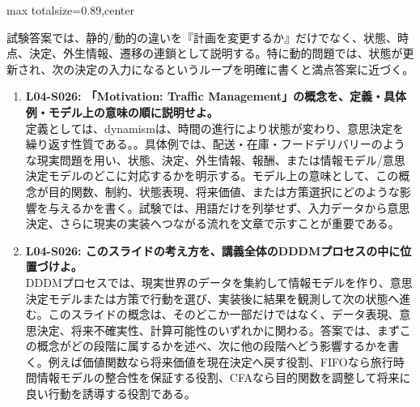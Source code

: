 \begin{minipage}[t]{0.58\textwidth}
\begin{adjustbox}{max totalsize={\textwidth}{0.89\textheight},center}
\begin{minipage}{\textwidth}
試験答案では、静的/動的の違いを『計画を変更するか』だけでなく、状態、時点、決定、外生情報、遷移の連鎖として説明する。特に動的問題では、状態が更新され、次の決定の入力になるというループを明確に書くと満点答案に近づく。\par{}\begin{enumerate}\item \textbf{L04-S026: 「Motivation: Traffic Management」の概念を、定義・具体例・モデル上の意味の順に説明せよ。}\\定義としては、dynamismは、時間の進行により状態が変わり、意思決定を繰り返す性質である。。具体例では、配送・在庫・フードデリバリーのような現実問題を用い、状態、決定、外生情報、報酬、または情報モデル/意思決定モデルのどこに対応するかを明示する。モデル上の意味として、この概念が目的関数、制約、状態表現、将来価値、または方策選択にどのような影響を与えるかを書く。試験では、用語だけを列挙せず、入力データから意思決定、さらに現実の実装へつながる流れを文章で示すことが重要である。\item \textbf{L04-S026: このスライドの考え方を、講義全体のDDDMプロセスの中に位置づけよ。}\\DDDMプロセスでは、現実世界のデータを集約して情報モデルを作り、意思決定モデルまたは方策で行動を選び、実装後に結果を観測して次の状態へ進む。このスライドの概念は、そのどこか一部だけではなく、データ表現、意思決定、将来不確実性、計算可能性のいずれかに関わる。答案では、まずこの概念がどの段階に属するかを述べ、次に他の段階へどう影響するかを書く。例えば価値関数なら将来価値を現在決定へ戻す役割、FIFOなら旅行時間情報モデルの整合性を保証する役割、CFAなら目的関数を調整して将来に良い行動を誘導する役割である。\end{enumerate}
\end{minipage}
\end{adjustbox}
\end{minipage}


